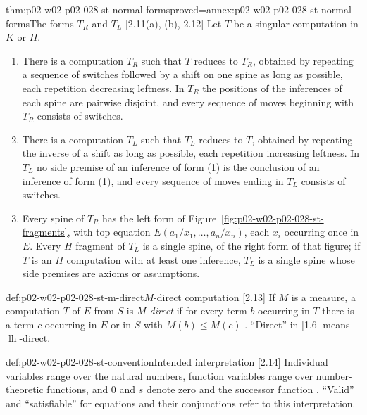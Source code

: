 \begin{hbtheorem}{thm:p02-w02-p02-028-st-normal-forms}{proved=annex:p02-w02-p02-028-st-normal-forms}{The forms \(T_R\) and \(T_L\) [2.11(a), (b), 2.12]}
Let \(T\) be a singular computation in \(K\) or \(H\).
\begin{enumerate}
  \item There is a computation \(T_R\) such that \(T\) reduces to \(T_R\),
        obtained by repeating a sequence of switches followed by a shift on
        one spine as long as possible, each repetition decreasing leftness.
        In \(T_R\) the positions of the inferences of each spine are pairwise
        disjoint, and every sequence of moves beginning with \(T_R\)
        consists of switches.
  \item There is a computation \(T_L\) such that \(T_L\) reduces to \(T\),
        obtained by repeating the inverse of a shift as long as possible,
        each repetition increasing leftness.  In \(T_L\) no side premise of
        an inference of form (1) is the conclusion of an inference of form
        (1), and every sequence of moves ending in \(T_L\) consists of
        switches.
  \item Every spine of \(T_R\) has the left form of
        Figure~\ref{fig:p02-w02-p02-028-st-fragments}, with top equation
        \(E(a_1/x_1,\ldots,a_n/x_n)\), each \(x_i\) occurring once in \(E\).
        Every \(H\) fragment of \(T_L\) is a single spine, of the right form
        of that figure; if \(T\) is an \(H\) computation with at least one
        inference, \(T_L\) is a single spine whose side premises are axioms
        or assumptions.
\end{enumerate}
\end{hbtheorem}

\begin{hbdefinition}{def:p02-w02-p02-028-st-m-direct}{\(M\)-direct computation [2.13]}
If \(M\) is a measure, a computation \(T\) of \(E\) from \(S\) is
\emph{\(M\)-direct} if for every term \(b\) occurring in \(T\) there is a
term \(c\) occurring in \(E\) or in \(S\) with \(M(b)\leq M(c)\)
\cite[\S2.13, p.~904]{Statman1977}.  ``Direct'' in [1.6] means
\(\operatorname{lh}\)-direct.
\end{hbdefinition}

\begin{hbconvention}{def:p02-w02-p02-028-st-convention}{Intended interpretation [2.14]}
Individual variables range over the natural numbers, function variables
range over number-theoretic functions, and \(0\) and \(s\) denote zero and
the successor function \cite[\S2.14, p.~904]{Statman1977}.  ``Valid'' and
``satisfiable'' for equations and their conjunctions refer to this
interpretation.
\end{hbconvention}

